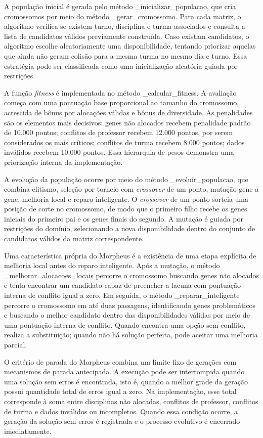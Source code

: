 A população inicial é gerada pelo método \_inicializar\_populacao, que cria cromossomos por meio do método \_gerar\_cromossomo. Para cada matriz, o algoritmo verifica se existem turno, disciplina e turma associados e consulta a lista de candidatos válidos previamente construída. Caso existam candidatos, o algoritmo escolhe aleatoriamente uma disponibilidade, tentando priorizar aquelas que ainda não geram colisão para a mesma turma no mesmo dia e turno. Essa estratégia pode ser classificada como uma inicialização aleatória guiada por restrições.

A função \textit{fitness} é implementada no método \_calcular\_fitness. A avaliação começa com uma pontuação base proporcional ao tamanho do cromossomo, acrescida de bônus por alocações válidas e bônus de diversidade. As penalidades são os elementos mais decisivos: genes não alocados recebem penalidade padrão de 10.000 pontos; conflitos de professor recebem 12.000 pontos, por serem considerados os mais críticos; conflitos de turma recebem 8.000 pontos; dados inválidos recebem 10.000 pontos. Essa hierarquia de pesos demonstra uma priorização interna da implementação.

A evolução da população ocorre por meio do método \_evoluir\_populacao, que combina elitismo, seleção por torneio com \textit{crossover} de um ponto, mutação gene a gene, melhoria local e reparo inteligente. O \textit{crossover} de um ponto sorteia uma posição de corte no cromossomo, de modo que o primeiro filho recebe os genes iniciais do primeiro pai e os genes finais do segundo. A mutação é guiada por restrições do domínio, selecionando a nova disponibilidade dentro do conjunto de candidatos válidos da matriz correspondente.

Uma característica própria do Morpheus é a existência de uma etapa explícita de melhoria local antes do reparo inteligente. Após a mutação, o método \_melhorar\_alocacoes\_locais percorre o cromossomo buscando genes não alocados e tenta encontrar um candidato capaz de preencher a lacuna com pontuação interna de conflito igual a zero. Em seguida, o método \_reparar\_inteligente percorre o cromossomo em até duas passagens, identificando genes problemáticos e buscando o melhor candidato dentro das disponibilidades válidas por meio de uma pontuação interna de conflito. Quando encontra uma opção sem conflito, realiza a substituição; quando não há solução perfeita, pode aceitar uma melhoria parcial.

O critério de parada do Morpheus combina um limite fixo de gerações com mecanismos de parada antecipada. A execução pode ser interrompida quando uma solução sem erros é encontrada, isto é, quando a melhor grade da geração possui quantidade total de erros igual a zero. Na implementação, esse total corresponde à soma entre disciplinas não alocadas, conflitos de professor, conflitos de turma e dados inválidos ou incompletos. Quando essa condição ocorre, a geração da solução sem erros é registrada e o processo evolutivo é encerrado imediatamente.

